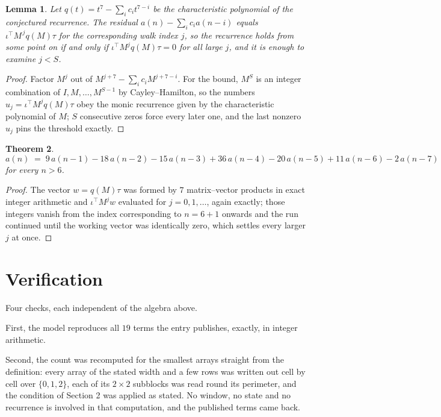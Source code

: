 \documentclass[11pt,a4paper]{article}
\theoremstyle{plain}
\newtheorem{theorem}{Theorem}
\newtheorem{lemma}[theorem]{Lemma}
\theoremstyle{definition}
\begin{document}
\begin{lemma}\label{lem:crit}
Let $q(t)=t^{7}-\sum_i c_it^{7-i}$ be the characteristic polynomial of the
conjectured recurrence. The residual $a(n)-\sum_ic_ia(n-i)$ equals
$\iota^{\!\top}M^{\,j}q(M)\tau$ for the corresponding walk index $j$, so the recurrence
holds from some point on if and only if $\iota^{\!\top}M^{j}q(M)\tau=0$ for all large $j$,
and it is enough to examine $j<S$.
\end{lemma}

\begin{proof}
Factor $M^{j}$ out of $M^{j+7}-\sum_ic_iM^{j+7-i}$. For the bound, $M^{S}$
is an integer combination of $I,M,\dots,M^{S-1}$ by Cayley--Hamilton, so the numbers
$u_j=\iota^{\!\top}M^{j}q(M)\tau$ obey the monic recurrence given by the characteristic
polynomial of $M$; $S$ consecutive zeros force every later one, and the last nonzero $u_j$
pins the threshold exactly.
\end{proof}

\begin{theorem}
\[
a(n)\;=\;9\,a(n-1) - 18\,a(n-2) - 15\,a(n-3) + 36\,a(n-4) - 20\,a(n-5) + 11\,a(n-6) - 2\,a(n-7)
\]
for every $n>6$.
\end{theorem}

\begin{proof}
The vector $w=q(M)\tau$ was formed by $7$ matrix--vector products in exact integer
arithmetic and $\iota^{\!\top}M^{j}w$ evaluated for $j=0,1,\dots$, again exactly; those
integers vanish from the index corresponding to $n=6+1$ onwards and the run continued
until the working vector was identically zero, which settles every larger $j$ at once.
\end{proof}

\section{Verification}

Four checks, each independent of the algebra above.

First, the model reproduces all $19$ terms the entry publishes, exactly, in integer
arithmetic.

Second, the count was recomputed for the smallest arrays straight from the definition: every
array of the stated width and a few rows was written out cell by cell over $\{0,1,2\}$, each of
its $2\times2$ subblocks was read round its perimeter, and the condition of Section 2 was
applied as stated. No window, no state and no recurrence is involved in that computation, and
the published terms came back.
\end{document}
